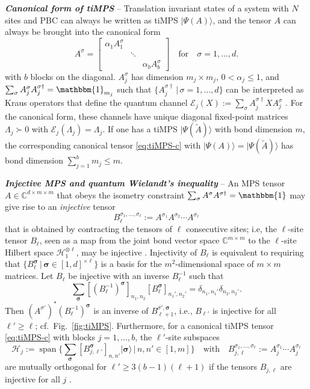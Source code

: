 \documentclass[english,11pt,aps,pra,onecolumn,tightenlines,groupedaddress,superscriptaddress,notitlepage,floatfix,fleqn]{revtex4-1}
\newcommand{\id}{\mathbbm{1}}
\newcommand{\ket}{\rangle}
\newcommand{\Span}{\operatorname{span}}
\renewcommand{\vec}[1]{{\boldsymbol{#1}}}
\newcommand{\s}{\sigma}
\newcommand{\vs}{\vec{\sigma}}
\newcommand{\CC}{\mathbb{C}}
\newcommand{\mc}[1]{\mathcal{#1}}
\renewcommand{\H}{\mc{H}}
\newcommand{\E}{\mc{E}}
\renewcommand{\Bmatrix}[1]{\begin{bmatrix}#1\end{bmatrix}}
\newcommand{\Emph}[1]{\textbf{\emph{#1}}}
\begin{document}
\Emph{Canonical form of tiMPS} \cite{Fannes1992-144,PerezGarcia2007-7} -- Translation invariant states of a system with $N$ sites and PBC can always be written as tiMPS $|\Psi(A)\ket$, and the tensor $A$ can always be brought into the canonical form
\begin{equation}\label{eq:tiMPS-c}
	A^\s=\Bmatrix{\alpha_1 A^\s_1 & &\\ & \ddots & \\ & & \alpha_b A^\s_b}\quad \text{for}\quad
	\s=1,\dotsc,d.
\end{equation}
with $b$ blocks on the diagonal. $A^\s_j$ has dimension $m_j\times m_j$, $0<\alpha_j\leq 1$, and $\sum_\s A^\s_j A^{\s\dag}_j=\id_{m_j}$ such that $\{A^{\s\dag}_j\,|\,\s=1,\dots,d\}$ can be interpreted as Kraus operators that define the quantum channel $\E_j(X):=\sum_\s A^{\s\dag}_j X A^\s_j$ \cite{Nielsen2000}. For the canonical form, these channels have unique diagonal fixed-point matrices $\Lambda_j\succ 0$ with $\E_j(\Lambda_j)=\Lambda_j$. If one has a tiMPS $|\Psi(\tilde{A})\ket$ with bond dimension $m$, the corresponding canonical tensor \eqref{eq:tiMPS-c} with $|\Psi(A)\ket=|\Psi(\tilde{A})\ket$ has bond dimension $\sum_{j=1}^b m_j\leq m$.

\Emph{Injective MPS and quantum Wielandt's inequality} \cite{Sanz2010-56,Michalek2019-65} -- An MPS tensor $A\in\CC^{d\times m\times m}$ that obeys the isometry constraint $\sum_\s A^\s A^{\s\dag}=\id$ may give rise to an \emph{injective} tensor
\begin{equation}\label{eq:l-siteTensor}
	B_\ell^{\s_1,\dotsc,\s_\ell}:=A^{\s_1}A^{\s_2}\dotsb A^{\s_\ell}
\end{equation}
that is obtained by contracting the tensors of $\ell$ consecutive sites; i.e, the $\ell$-site tensor $B_\ell$,
seen as a map from the joint bond vector space $\CC^{m\times m}$ to the $\ell$-site Hilbert space $\H_1^{\otimes\ell}$, may be injective \cite{Fannes1992-144,PerezGarcia2007-7,Molnar2018-20}. Injectivity of $B_\ell$ is equivalent to requiring that $\{B_\ell^\vs\,|\,\vs\in [1,d]^{\times \ell}\}$ is a basis for the $m^2$-dimensional space of $m\times m$ matrices. Let $B_\ell$ be injective with an inverse $B^{-1}_\ell$ such that
\begin{equation}\label{eq:injectiveBlockTensor}\textstyle
	\sum_\vs [(B^{-1}_\ell)^\vs]_{n_1,n_2} [B^\vs_\ell]_{n_1',n_2'}=\delta_{n_1,n_1'}\delta_{n_2,n_2'}.
\end{equation}
Then $(A^{\s'})^\ast (B^{-1}_\ell)^\vs $ is an inverse of $B^{\s',\vs}_{\ell+1}$, i.e., $B_{\ell'}$ is injective for all $\ell'\geq \ell$; cf.\ Fig.~\ref{fig:tiMPS}. Furthermore, for a canonical tiMPS tensor \eqref{eq:tiMPS-c} with blocks $j=1,\dotsc,b$, the $\ell'$-site subspaces
\begin{equation}\label{eq:l-siteTensorBlock} \textstyle
	\H_j:=\Span\big\{\sum_{\vs} [B_{j,\ell'}^{\vs}]_{n,n'}|\vs\ket\,|\,n,n'\in [1,m]\big\}\quad\text{with}\quad
	B_{j,\ell}^{\s_1,\dotsc,\s_\ell}:=A_j^{\s_1}\dotsb A_j^{\s_\ell}
\end{equation}
are mutually orthogonal for $\ell'\geq 3(b-1)(\ell+1)$ if the tensors $B_{j,\ell}$ are injective for all $j$ \cite{PerezGarcia2007-7}.
\end{document}
